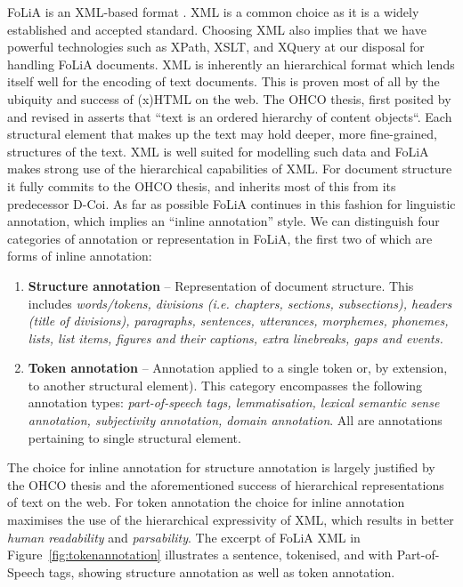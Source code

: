 \documentclass[a4paper,10pt,twoside]{article}
\begin{document}
FoLiA is an XML-based format \cite{XML}. XML is a common choice as it is a widely
established and accepted standard. Choosing XML also implies that we have
powerful technologies such as XPath, XSLT, and XQuery at our disposal for handling FoLiA documents. XML is
inherently an hierarchical format which lends itself well for the encoding of
text documents. This is proven most of all by the ubiquity and success of (x)HTML on the web.
The OHCO thesis, first posited by \cite{OHCO1} and revised in \cite{OHCO2}
asserts that ``text is an ordered hierarchy of content objects``. Each
structural element that makes up the text may hold deeper, more fine-grained,
structures of the text. XML is well suited for modelling such data and FoLiA
makes strong use of the hierarchical capabilities of XML. For document
structure it fully commits to the OHCO thesis, and inherits most of this from its
predecessor D-Coi. As far as possible FoLiA continues in this fashion for
linguistic annotation, which implies an ``inline
annotation'' style. We can distinguish four categories of annotation or
representation in FoLiA, the first two of which are forms of inline annotation:

\begin{enumerate}
\item \textbf{Structure annotation} -- Representation of document structure.
  This includes \emph{words/tokens, divisions (i.e. chapters, sections,
  subsections), headers (title of divisions), paragraphs, sentences,
  utterances, morphemes,
  phonemes, lists,
  list items, figures and their captions, extra linebreaks, gaps and events.}
\item \textbf{Token annotation} -- Annotation applied to a single token or, by
  extension, to another structural element). This category encompasses the
  following annotation types: \emph{part-of-speech tags, lemmatisation, lexical
  semantic sense annotation, subjectivity annotation, domain annotation}. All
  are annotations pertaining to single structural element.
  \setcounter{enumTemptwo}{\theenumi}
\end{enumerate}

The choice for inline annotation for structure annotation is largely justified
by the OHCO thesis and the aforementioned success of hierarchical representations of text on
the web. For token annotation the choice for inline annotation maximises the
use of the hierarchical expressivity of XML, which results in better \emph{human
readability} and \emph{parsability}. The excerpt of FoLiA XML in
Figure~\ref{fig:tokenannotation} illustrates a sentence, tokenised, and with
Part-of-Speech tags, showing structure annotation as well as token annotation.
\end{document}
